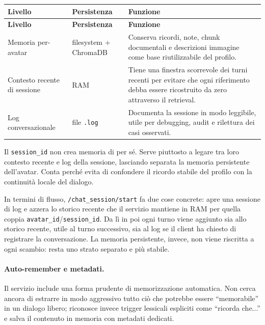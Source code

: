\par\begingroup
\small
\setlength{\LTleft}{0pt}
\setlength{\LTright}{0pt}
\captionsetup{type=table}
\label{tab:appendix-rag-memory-levels}
\begin{longtable}{|>{\raggedright\arraybackslash}p{}|>{\raggedright\arraybackslash}p{}|>{\raggedright\arraybackslash}p{}|}
\hline
\textbf{Livello} & \textbf{Persistenza} & \textbf{Funzione} \\
\hline
\endfirsthead
\hline
\textbf{Livello} & \textbf{Persistenza} & \textbf{Funzione} \\
\hline
\endhead
Memoria per-avatar & filesystem + ChromaDB & Conserva ricordi, note, chunk documentali e descrizioni immagine come base riutilizzabile del profilo. \\
\hline
Contesto recente di sessione & RAM & Tiene una finestra scorrevole dei turni recenti per evitare che ogni riferimento debba essere ricostruito da zero attraverso il retrieval. \\
\hline
Log conversazionale & file \texttt{.log} & Documenta la sessione in modo leggibile, utile per debugging, audit e rilettura dei casi osservati. \\
\hline
\end{longtable}
\par\endgroup

Il \texttt{session\_id} non crea memoria di per sé. Serve piuttosto a legare tra loro contesto recente e log della sessione, lasciando separata la memoria persistente dell'avatar. Conta perché evita di confondere il ricordo stabile del profilo con la continuità locale del dialogo.

In termini di flusso, \texttt{/chat\_session/start} fa due cose concrete: apre una sessione di log e azzera lo storico recente che il servizio mantiene in RAM per quella coppia \texttt{avatar\_id}/\texttt{session\_id}. Da lì in poi ogni turno viene aggiunto sia allo storico recente, utile al turno successivo, sia al log se il client ha chiesto di registrare la conversazione. La memoria persistente, invece, non viene riscritta a ogni scambio: resta uno strato separato e più stabile.

\paragraph{Auto-remember e metadati.}
Il servizio include una forma prudente di memorizzazione automatica. Non cerca ancora di estrarre in modo aggressivo tutto ciò che potrebbe essere ``memorabile'' in un dialogo libero; riconosce invece trigger lessicali espliciti come ``ricorda che...'' e salva il contenuto in memoria con metadati dedicati.

